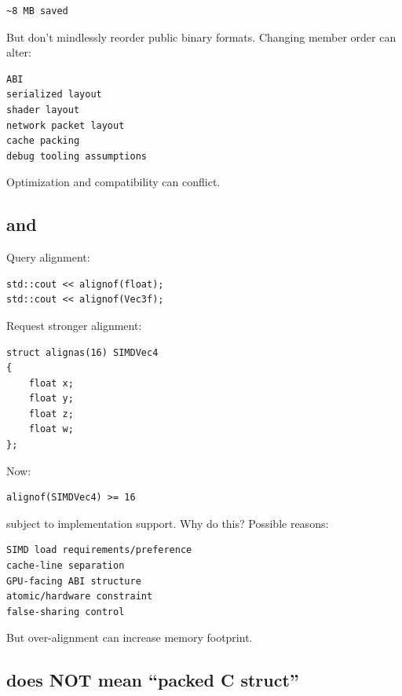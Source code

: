 \begin{verbatim}
~8 MB saved
\end{verbatim}

But don't mindlessly reorder public binary formats. Changing member order can alter:

\begin{verbatim}
ABI
serialized layout
shader layout
network packet layout
cache packing
debug tooling assumptions
\end{verbatim}

Optimization and compatibility can conflict.

\subsection{\texorpdfstring{ and }{alignof and alignas}}\label{05-engine-i-ch003-alignof-and-alignas}

\hypertarget{05-engine-i-ch003-alignof-and-alignas}{}

Query alignment:

\begin{verbatim}
std::cout << alignof(float);
std::cout << alignof(Vec3f);
\end{verbatim}

Request stronger alignment:

\begin{verbatim}
struct alignas(16) SIMDVec4
{
    float x;
    float y;
    float z;
    float w;
};
\end{verbatim}

Now:

\begin{verbatim}
alignof(SIMDVec4) >= 16
\end{verbatim}

subject to implementation support. Why do this? Possible reasons:

\begin{verbatim}
SIMD load requirements/preference
cache-line separation
GPU-facing ABI structure
atomic/hardware constraint
false-sharing control
\end{verbatim}

But over-alignment can increase memory footprint.

\subsection{\texorpdfstring{ does NOT mean ``packed C struct''}{standard-layout does NOT mean ``packed C struct''}}\label{05-engine-i-ch003-standard-layout-does-not-mean-packed-c-struct}

